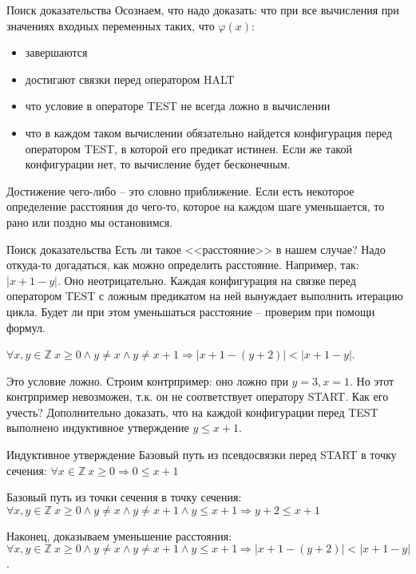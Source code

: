 \documentclass[hyperref={unicode=true}]{beamer}
\begin{document}
    \begin{frame}{Поиск доказательства}
    Осознаем, что надо доказать: что при все вычисления при значениях входных переменных таких, что $\varphi(x)$:
    \begin{itemize}
    \item завершаются
    \item достигают связки перед оператором HALT
    \item что условие в операторе TEST не всегда ложно в вычислении
    \item что в каждом таком вычислении обязательно найдется конфигурация перед оператором TEST, в которой его предикат истинен. Если же такой конфигурации нет, то вычисление будет бесконечным.
    \end{itemize}

    Достижение чего-либо -- это словно приближение. Если есть некоторое определение расстояния до чего-то, которое на каждом шаге уменьшается, то рано или поздно мы остановимся.
    \end{frame}

    \begin{frame}{Поиск доказательства}
    Есть ли такое <<расстояние>> в нашем случае? Надо откуда-то догадаться, как можно определить расстояние. Например, так: $|x + 1 - y|$. Оно неотрицательно. Каждая конфигурация на связке перед оператором TEST с ложным предикатом на ней вынуждает выполнить итерацию цикла. Будет ли при этом уменьшаться расстояние -- проверим при помощи формул.

    $\forall x, y \in \mathbb{Z} ~ x \geq 0 \land y \neq x \land y \neq x + 1 \Rightarrow |x + 1 - (y + 2)| < |x + 1 - y|$.

    Это условие ложно. Строим контрпример: оно ложно при $y = 3, x = 1$. Но этот контрпример невозможен, т.к. он не соответствует оператору START. Как его учесть? Дополнительно доказать, что на каждой конфигурации перед TEST выполнено индуктивное утверждение $y \leq x + 1$.
    \end{frame}

    \begin{frame}{Индуктивное утверждение}
    Базовый путь из псевдосвязки перед START в точку сечения: $\forall x \in \mathbb{Z} ~ x \geq 0 \Rightarrow 0 \leq x + 1$

    Базовый путь из точки сечения в точку сечения: $\forall x, y \in \mathbb{Z} ~ x \geq 0 \land y \neq x \land y \neq x + 1 \land y \leq x + 1 \Rightarrow y + 2 \leq x + 1$

    Наконец, доказываем уменьшение расстояния:
    $\forall x, y \in \mathbb{Z} ~ x \geq 0 \land y \neq x \land y \neq x + 1 \land y \leq x + 1 \Rightarrow |x + 1 - (y + 2)| < |x + 1 - y|$.
    \end{frame}
\end{document}
